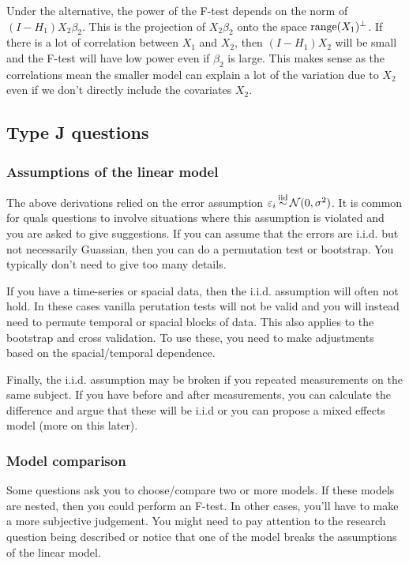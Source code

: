 Under the alternative, the power of the F-test depends on the norm of $(I-H_1)X_2\beta_2$. This is the projection of $X_2\beta_2$ onto the space $\mathrm{range}(X_1)^\perp$. If there is a lot of correlation between $X_1$ and $X_2$, then $(I-H_1)X_2$ will be small and the F-test will have low power even if $\beta_2$ is large. This makes sense as the correlations mean the smaller model can explain a lot of the variation due to $X_2$ even if we don't directly include the covariates $X_2$. 


\subsection{Type J questions}



\subsubsection*{Assumptions of the linear model}
The above derivations relied on the error assumption $\varepsilon_i \simiid \mathcal{N}(0,\sigma^2)$. It is common for quals questions to involve situations where this assumption is violated and you are asked to give suggestions. If you can assume that the errors are i.i.d. but not necessarily Guassian, then you can do a permutation test or bootstrap. You typically don't need to give too many details.

If you have a time-series or spacial data, then the i.i.d. assumption will often not hold. In these cases vanilla perutation tests will not be valid and you will instead need to permute temporal or spacial blocks of data. This also applies to the bootstrap and cross validation. To use these, you need to make adjustments based on the spacial/temporal dependence.

Finally, the i.i.d. assumption may be broken if you repeated measurements on the same subject. If you have before and after measurements, you can calculate the difference and argue that these will be i.i.d or you can propose a mixed effects model (more on this later).   

\subsubsection*{Model comparison}

Some questions ask you to choose/compare two or more models. If these models are nested, then you could perform an F-test. In other cases, you'll have to make a more subjective judgement. You might need to pay attention to the research question being described or notice that one of the model breaks the assumptions of the linear model.

